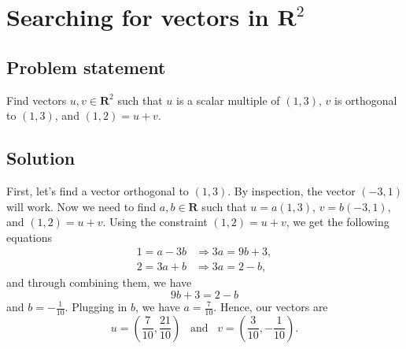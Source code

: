 \documentclass{article}
\begin{document}
\clearpage

\section{Searching for vectors in $\mathbf{R}^2$}
\subsection*{Problem statement}
Find vectors $u,v\in \mathbf{R}^2$ such that $u$ is a scalar multiple of $(1,3)$, $v$ is orthogonal to $(1,3)$, and $(1,2)=u+v$.

\subsection*{Solution}
First, let's find a vector orthogonal to $(1,3)$. 
By inspection, the vector $(-3,1)$ will work. 
Now we need to find $a,b\in\mathbf{R}$ such that $u=a(1,3)$, $v=b(-3,1)$, and $(1,2)=u+v$. 
Using the constraint $(1,2)=u+v$, we get the following equations
\begin{align*} 
1=a-3b &\Rightarrow 3a=9b+3, \\ 
2=3a+b &\Rightarrow 3a=2-b,
\end{align*}
and through combining them, we have
\[9b+3=2-b\]
and $b=-\frac{1}{10}$. 
Plugging in $b$, we have $a=\frac{7}{10}$. 
Hence, our vectors are
\[u=(\frac{7}{10},\frac{21}{10}) \;\;\;\text{and}\;\;\; v=(\frac{3}{10},-\frac{1}{10}).\]
\end{document}
